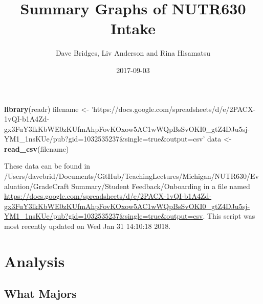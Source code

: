 \documentclass[]{article}
\title{Summary Graphs of NUTR630 Intake}
\author{Dave Bridges, Liv Anderson and Rina Hisamatsu}
\date{2017-09-03}
\newenvironment{Shaded}{\begin{snugshade}}{\end{snugshade}}
\newcommand{\KeywordTok}[1]{\textcolor[rgb]{0.13,0.29,0.53}{\textbf{{#1}}}}
\newcommand{\StringTok}[1]{\textcolor[rgb]{0.31,0.60,0.02}{{#1}}}
\newcommand{\NormalTok}[1]{{#1}}
\begin{document}
\maketitle

{
\setcounter{tocdepth}{2}
\tableofcontents
}
\begin{Shaded}
\begin{Highlighting}[]
\KeywordTok{library}\NormalTok{(readr)}
\NormalTok{filename <-}\StringTok{ 'https://docs.google.com/spreadsheets/d/e/2PACX-1vQI-b1A4Zd-gx3FuY3lkKbWE0zKUfmAhpFovKOxow5AC1wWQpBsSvOKI0_gtZ4DJu5sj-YM1_1nsKUe/pub?gid=1032535237&single=true&output=csv'}
\NormalTok{data <-}\StringTok{ }\KeywordTok{read_csv}\NormalTok{(filename)}
\end{Highlighting}
\end{Shaded}

These data can be found in
/Users/davebrid/Documents/GitHub/TeachingLectures/Michigan/NUTR630/Evaluation/GradeCraft
Summary/Student Feedback/Onboarding in a file named
\url{https://docs.google.com/spreadsheets/d/e/2PACX-1vQI-b1A4Zd-gx3FuY3lkKbWE0zKUfmAhpFovKOxow5AC1wWQpBsSvOKI0_gtZ4DJu5sj-YM1_1nsKUe/pub?gid=1032535237\&single=true\&output=csv}.
This script was most recently updated on Wed Jan 31 14:10:18 2018.

\section{Analysis}\label{analysis}

\subsection{What Majors}\label{what-majors}
\end{document}
